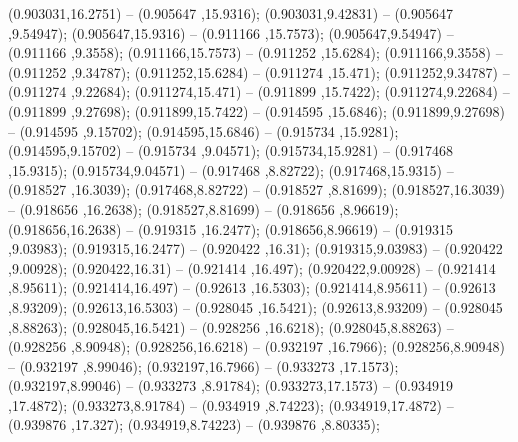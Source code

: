  (0.903031,16.2751) -- (0.905647 ,15.9316);
 (0.903031,9.42831) -- (0.905647 ,9.54947);
 (0.905647,15.9316) -- (0.911166 ,15.7573);
 (0.905647,9.54947) -- (0.911166 ,9.3558);
 (0.911166,15.7573) -- (0.911252 ,15.6284);
 (0.911166,9.3558) -- (0.911252 ,9.34787);
 (0.911252,15.6284) -- (0.911274 ,15.471);
 (0.911252,9.34787) -- (0.911274 ,9.22684);
 (0.911274,15.471) -- (0.911899 ,15.7422);
 (0.911274,9.22684) -- (0.911899 ,9.27698);
 (0.911899,15.7422) -- (0.914595 ,15.6846);
 (0.911899,9.27698) -- (0.914595 ,9.15702);
 (0.914595,15.6846) -- (0.915734 ,15.9281);
 (0.914595,9.15702) -- (0.915734 ,9.04571);
 (0.915734,15.9281) -- (0.917468 ,15.9315);
 (0.915734,9.04571) -- (0.917468 ,8.82722);
 (0.917468,15.9315) -- (0.918527 ,16.3039);
 (0.917468,8.82722) -- (0.918527 ,8.81699);
 (0.918527,16.3039) -- (0.918656 ,16.2638);
 (0.918527,8.81699) -- (0.918656 ,8.96619);
 (0.918656,16.2638) -- (0.919315 ,16.2477);
 (0.918656,8.96619) -- (0.919315 ,9.03983);
 (0.919315,16.2477) -- (0.920422 ,16.31);
 (0.919315,9.03983) -- (0.920422 ,9.00928);
 (0.920422,16.31) -- (0.921414 ,16.497);
 (0.920422,9.00928) -- (0.921414 ,8.95611);
 (0.921414,16.497) -- (0.92613 ,16.5303);
 (0.921414,8.95611) -- (0.92613 ,8.93209);
 (0.92613,16.5303) -- (0.928045 ,16.5421);
 (0.92613,8.93209) -- (0.928045 ,8.88263);
 (0.928045,16.5421) -- (0.928256 ,16.6218);
 (0.928045,8.88263) -- (0.928256 ,8.90948);
 (0.928256,16.6218) -- (0.932197 ,16.7966);
 (0.928256,8.90948) -- (0.932197 ,8.99046);
 (0.932197,16.7966) -- (0.933273 ,17.1573);
 (0.932197,8.99046) -- (0.933273 ,8.91784);
 (0.933273,17.1573) -- (0.934919 ,17.4872);
 (0.933273,8.91784) -- (0.934919 ,8.74223);
 (0.934919,17.4872) -- (0.939876 ,17.327);
 (0.934919,8.74223) -- (0.939876 ,8.80335);
